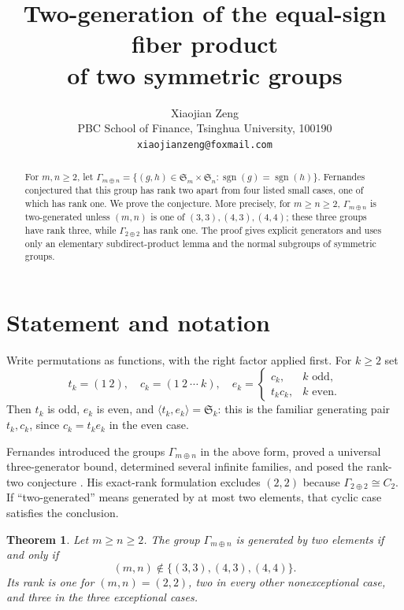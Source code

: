 \documentclass[11pt]{article}
\title{Two-generation of the equal-sign fiber product\\of two symmetric groups}
\author{Xiaojian Zeng\\\small PBC School of Finance, Tsinghua University, 100190\\\small \texttt{xiaojianzeng@foxmail.com}}
\date{}
\newtheorem{theorem}{Theorem}
\newcommand{\Sym}{\mathfrak S}
\newcommand{\sgn}{\operatorname{sgn}}
\begin{document}
\maketitle
\begin{abstract}
For $m,n\ge2$, let $\Gamma_{m\oplus n}=\{(g,h)\in\Sym_m\times\Sym_n:\sgn(g)=\sgn(h)\}$. Fernandes conjectured that this group has rank two apart from four listed small cases, one of which has rank one. We prove the conjecture. More precisely, for $m\ge n\ge2$, $\Gamma_{m\oplus n}$ is two-generated unless $(m,n)$ is one of $(3,3),(4,3),(4,4)$; these three groups have rank three, while $\Gamma_{2\oplus2}$ has rank one. The proof gives explicit generators and uses only an elementary subdirect-product lemma and the normal subgroups of symmetric groups.
\end{abstract}

\section{Statement and notation}
Write permutations as functions, with the right factor applied first. For $k\ge2$ set
\[
t_k=(1\ 2),\quad c_k=(1\ 2\ \cdots\ k),\quad
e_k=\begin{cases}c_k,&k\text{ odd},\\t_kc_k,&k\text{ even}.
\end{cases}
\]
Then $t_k$ is odd, $e_k$ is even, and $\langle t_k,e_k\rangle=\Sym_k$: this is the familiar generating pair $t_k,c_k$, since $c_k=t_ke_k$ in the even case.

Fernandes introduced the groups $\Gamma_{m\oplus n}$ in the above form, proved a universal three-generator bound, determined several infinite families, and posed the rank-two conjecture \cite{Fernandes2026}. His exact-rank formulation excludes $(2,2)$ because $\Gamma_{2\oplus2}\cong C_2$. If ``two-generated'' means generated by at most two elements, that cyclic case satisfies the conclusion.

\begin{theorem}\label{thm:main}
Let $m\ge n\ge2$. The group $\Gamma_{m\oplus n}$ is generated by two elements if and only if
\[
(m,n)\notin\bigl\{(3,3),(4,3),(4,4)\bigr\}.
\]
Its rank is one for $(m,n)=(2,2)$, two in every other nonexceptional case, and three in the three exceptional cases.
\end{theorem}
\end{document}
